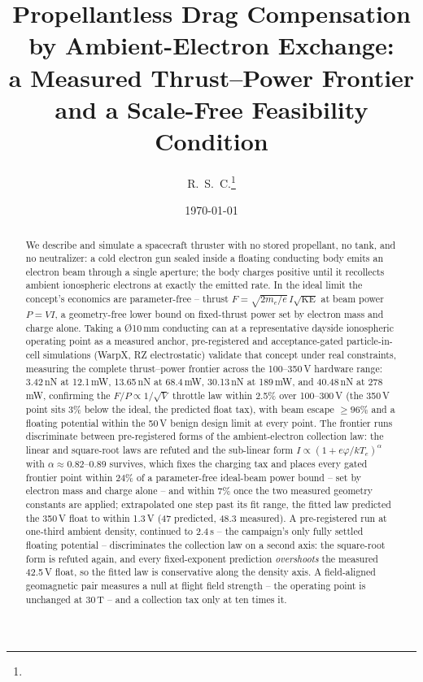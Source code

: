 \documentclass[11pt]{article}
\title{Propellantless Drag Compensation by Ambient-Electron Exchange:\\
       a Measured Thrust--Power Frontier and a Scale-Free Feasibility Condition}
\author{R.~S.~C.\thanks{\todo{author list, affiliation, email}}}
\date{\today}
\begin{document}
\maketitle

\begin{abstract}
We describe and simulate a spacecraft thruster with no stored propellant, no
tank, and no neutralizer: a cold electron gun sealed inside a floating
conducting body emits an electron beam through a single aperture; the body
charges positive until it recollects ambient ionospheric electrons at exactly
the emitted rate. In the ideal limit the concept's economics are
parameter-free -- thrust $F = \sqrt{2m_e/e}\,I\sqrt{\mathrm{KE}}$ at beam
power $P = VI$, a geometry-free lower bound on fixed-thrust power set by
electron mass and charge alone. Taking a \O10\,mm conducting can at a
representative dayside ionospheric operating point as a measured anchor,
pre-registered and acceptance-gated particle-in-cell simulations (WarpX, RZ
electrostatic) validate that concept under real constraints, measuring the
complete thrust--power frontier across the 100--350\,V hardware
range: 3.42\,nN at 12.1\,mW, 13.65\,nN at 68.4\,mW, 30.13\,nN at
189\,mW, and 40.48\,nN at 278\,mW, confirming the $F/P \propto 1/\sqrt{V}$
throttle law within 2.5\% over 100--300\,V (the 350\,V point sits 3\%
below the ideal, the predicted float tax), with beam escape $\ge 96\%$ and
a floating potential within the 50\,V benign design limit at every point.
The frontier runs discriminate between
pre-registered forms of the ambient-electron collection law: the linear and
square-root laws are refuted and the sub-linear form
$I \propto (1+e\varphi/kT_e)^{\alpha}$ with $\alpha \approx 0.82$--0.89
survives, which fixes the charging tax and places every gated frontier
point within 24\% of a parameter-free ideal-beam power bound -- set by
electron mass and charge alone -- and within 7\% once the two measured
geometry constants are applied; extrapolated one step past its fit range,
the fitted law predicted the 350\,V float to within 1.3\,V (47 predicted,
48.3 measured). A pre-registered run at one-third ambient
density, continued to 2.4\,\textmu s -- the campaign's only fully settled
floating potential -- discriminates the collection law on a second axis:
the square-root form is refuted again, and every fixed-exponent
prediction \emph{overshoots} the measured 42.5\,V float, so the fitted
law is conservative along the density axis. A field-aligned geomagnetic
pair measures a null at flight field strength -- the operating point is
unchanged at 30\,\textmu T -- and a collection tax only at ten times it.

\end{abstract}
\end{document}
